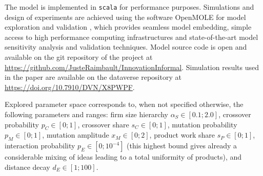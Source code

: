\documentclass[letterpaper]{article}
\begin{document}
The model is implemented in \texttt{scala} for performance purposes. Simulations and design of experiments are achieved using the software OpenMOLE for model exploration and validation \citep{reuillon2013openmole}, which provides seamless model embedding, simple access to high performance computing infrastructures and state-of-the-art model sensitivity analysis and validation techniques. Model source code is open and available on the git repository of the project at \url{https://github.com/JusteRaimbault/InnovationInformal}. Simulation results used in the paper are available on the dataverse repository at \url{https://doi.org/10.7910/DVN/X8PWPF}.

Explored parameter space corresponds to, when not specified otherwise, the following parameters and ranges: firm size hierarchy $\alpha_S \in [0.1 ; 2.0]$, crossover probability $p_C \in [0 ; 1]$, crossover share $s_C \in [0 ; 1]$, mutation probability $p_M \in [0 ; 1]$, mutation amplitude $x_M \in [0 ; 2]$, product work share $s_P \in [0 ; 1]$, interaction probability $p_E \in [0 ; 10^{-4}]$ (this highest bound gives already a considerable mixing of ideas leading to a total uniformity of products), and distance decay $d_E \in [1 ; 100]$.
\end{document}
